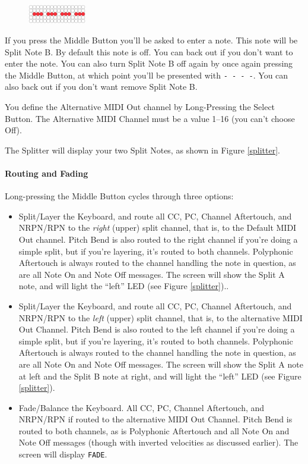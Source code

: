 \documentclass{article}
\begin{document}
\begin{figure}
\vspace{-1em}\includegraphics[width=1in]{none}
\vspace{-2em}
\end{figure}

If you press the Middle Button you'll be asked to enter a note.  This note will be Split Note B.  By default this note is off.  You can back out if you don't want to enter the note.  You can also turn Split Note B off again by once again pressing the Middle Button, at which point you'll be presented with \texttt{-~-~-~-}.  You can also back out if you don't want remove Split Note B.

You define the Alternative MIDI Out channel by Long-Pressing the Select Button.  The Alternative MIDI Channel must be a value 1--16 (you can't choose Off).

The Splitter will display your two Split Notes, as shown in Figure \ref{splitter}.

\paragraph{Routing and Fading}

Long-pressing the Middle Button cycles through three options:
\begin{itemize}
\item Split/Layer the Keyboard, and route all CC, PC, Channel Aftertouch, and NRPN/RPN to the {\it right} (upper) split channel, that is, to the Default MIDI Out channel.  Pitch Bend is also routed to the right channel if you're doing a simple split, but if you're layering, it's routed to both channels.  Polyphonic Aftertouch is always routed to the channel handling the note in question, as are all Note On and Note Off messages.  The screen will show the Split A note, and will light the ``left'' LED (see Figure \ref{splitter})..
\item Split/Layer the Keyboard, and route all CC, PC, Channel Aftertouch, and NRPN/RPN to the {\it left} (upper) split channel, that is, to the alternative MIDI Out Channel.  Pitch Bend is also routed to the left channel if you're doing a simple split, but if you're layering, it's routed to both channels.  Polyphonic Aftertouch is always routed to the channel handling the note in question, as are all Note On and Note Off messages.  The screen will show the Split A note at left and the Split B note at right, and will light the ``left'' LED (see Figure \ref{splitter}).
\item Fade/Balance the Keyboard.  All CC, PC, Channel Aftertouch, and NRPN/RPN if routed to the alternative MIDI Out Channel.  Pitch Bend is routed to both channels, as is Polyphonic Aftertouch and all Note On and Note Off messages (though with inverted velocities as discussed earlier).  The screen will display \texttt{FADE}.
\end{itemize}
\end{document}
